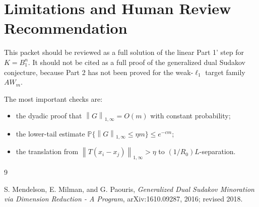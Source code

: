 \documentclass[11pt]{article}
\newcommand{\Pbb}{\mathbb P}
\newcommand{\norm}[1]{\left\lVert #1 \right\rVert}
\begin{document}
\section*{Limitations and Human Review Recommendation}

This packet should be reviewed as a full solution of the linear Part 1' step
for \(K=B_1^n\).  It should not be cited as a full proof of the generalized
dual Sudakov conjecture, because Part 2 has not been proved for the
weak-\(\ell_1\) target family \(A W_m\).

The most important checks are:
\begin{itemize}
\item the dyadic proof that \(\norm{G}_{1,\infty}=O(m)\) with constant
probability;
\item the lower-tail estimate \(\Pbb\{\norm{G}_{1,\infty}\le\eta m\}\le
e^{-cm}\);
\item the translation from \(\norm{T(x_i-x_j)}_{1,\infty}>\eta\) to
\((1/R_0)L\)-separation.
\end{itemize}

\begin{thebibliography}{9}

S. Mendelson, E. Milman, and G. Paouris,
\emph{Generalized Dual Sudakov Minoration via Dimension Reduction - A Program},
arXiv:1610.09287, 2016; revised 2018.

\end{thebibliography}
\end{document}
